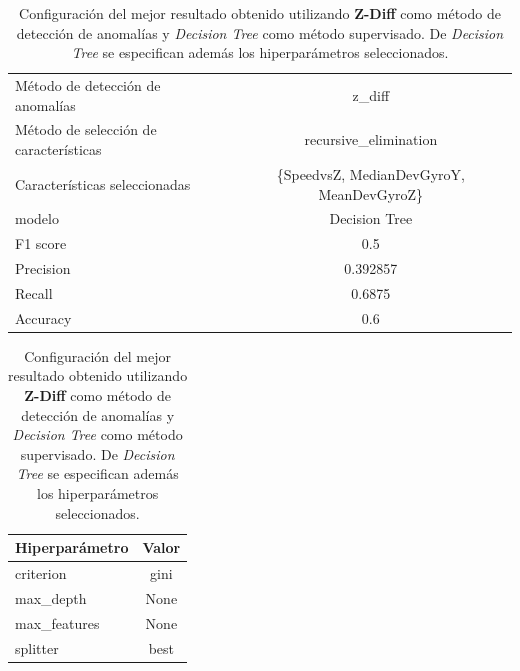 \begin{appendices}
		\begin{table}[htb]
			\centering
			\caption{Configuración del mejor resultado obtenido utilizando \textbf{Z-Diff} como método de detección de anomalías y \emph{Decision Tree}
			como método supervisado. De \emph{Decision Tree} se especifican además los hiperparámetros seleccionados.}
			\label{table:22}
			\begin{tabular}{lc}
				\toprule
					  Método de detección de anomalías &                                   z\_diff \\
				Método de selección de características &                    recursive\_elimination \\
						 Características seleccionadas & \{SpeedvsZ, MedianDevGyroY, MeanDevGyroZ\}\\
												modelo &                            Decision Tree \\
											  F1 score &                                      0.5 \\
											 Precision &                                 0.392857 \\
												Recall &                                   0.6875 \\
											  Accuracy &                                      0.6 \\
				\bottomrule
				\end{tabular}
			\newline
			\newline

			\begin{tabular}{lc}
				\toprule
				Hiperparámetro & Valor \\
				\midrule
					 criterion &  gini \\
					 max\_depth &  None \\
				  max\_features &  None \\
					  splitter &  best \\
				\bottomrule
			\end{tabular}
			
		\end{table}


\end{appendices}
